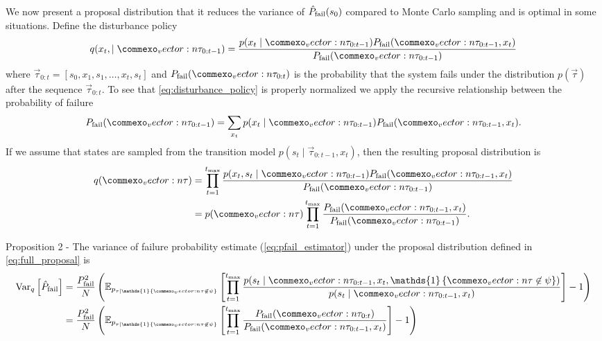 We now present a proposal distribution that it reduces the variance of $\hat{P}_{\rm fail}(s_0)$ compared to Monte Carlo sampling and is optimal in some situations. Define the disturbance policy
\begin{equation}
    q(x_t, \mid \vec{\tau}_{0:t-1}) = \frac{p(x_t \mid \vec{\tau}_{0:t-1}) P_{\rm fail}(\vec{\tau}_{0:t-1}, x_t)}{P_{\rm fail}(\vec{\tau}_{0:t-1})} \label{eq:disturbance_policy}
\end{equation}
where $\vec{\tau}_{0:t} = [s_0, x_1, s_1, \ldots, x_t, s_t]$ and $P_{\rm fail}(\vec{\tau}_{0:t})$ is the probability that the system fails under the distribution $p(\vec{\tau})$ after the sequence $\vec{\tau}_{0:t}$. To see that \cref{eq:disturbance_policy} is properly normalized we apply the recursive relationship between the probability of failure
\begin{equation}
    P_{\rm fail}(\vec{\tau}_{0:t-1}) = \sum_{x_t} p(x_t \mid \vec{\tau}_{0:t-1}) P_{\rm fail}(\vec{\tau}_{0:t-1}, x_t) \text{.}
\end{equation}
If we assume that states are sampled from the transition model $p(s_t \mid \vec{\tau}_{0:t-1}, x_t)$, then the resulting proposal distribution is
\begin{align}
    q(\vec{\tau}) &= \prod_{t=1}^{t_{\rm max}} \frac{p(x_t, s_t \mid \vec{\tau}_{0:t-1}) P_{\rm fail}(\vec{\tau}_{0:t-1}, x_t)}{P_{\rm fail}(\vec{\tau}_{0:t-1})} \\
    &= p(\vec{\tau}) \prod_{t=1}^{t_{\rm max}} \frac{P_{\rm fail}(\vec{\tau}_{0:t-1}, x_t)}{P_{\rm fail}(\vec{\tau}_{0:t-1})} \text{.} \label{eq:full_proposal}
\end{align}





Proposition 2 - The variance of failure probability estimate (\cref{eq:pfail_estimator}) under the proposal distribution defined in \cref{eq:full_proposal} is 
\begin{align}
    \text{Var}_q\left[ \hat{P}_{\rm fail} \right] &= \frac{P_{\rm fail}^2}{N} \left( \mathbb{E}_{p_{\tau \mid \mathds{1} \{\vec{\tau} \not \in \psi\}}}  \left[ \prod_{t=1}^{t_{\rm max}} \frac{p(s_t \mid \vec{\tau}_{0:t-1}, x_t, \mathds{1} \left\{ \vec{\tau} \not \in \psi \right\})}{p(s_t \mid \vec{\tau}_{0:t-1}, x_t)} \right] - 1 \right) \\
    &= \frac{P_{\rm fail}^2}{N} \left( \mathbb{E}_{p_{\tau \mid \mathds{1} \{\vec{\tau} \not \in \psi\}}}  \left[ \prod_{t=1}^{t_{\rm max}} \frac{P_{\rm fail}(\vec{\tau}_{0:t})}{P_{\rm fail}(\vec{\tau}_{0:t-1}, x_t)} \right] - 1 \right) \\
\end{align}

